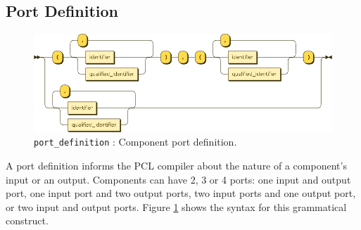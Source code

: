 \subsection{Port Definition}\label{subsec:port-def}
\begin{figure}[h!]
  \centering
    \includegraphics[scale=\DiagramScale,angle=90]{chapters/compiler/diagrams/port_definition}
  \caption{\texttt{port\_definition} : Component port definition.}
  \label{fig:pcl-port-def}
\end{figure}
A port definition informs the PCL compiler about the nature of a component's input or an output. Components can have 2, 3 or 4 ports: one input and output port, one input port and two output ports, two input ports and one output port, or two input and output ports. Figure \ref{fig:pcl-port-def} shows the syntax for this grammatical construct.


